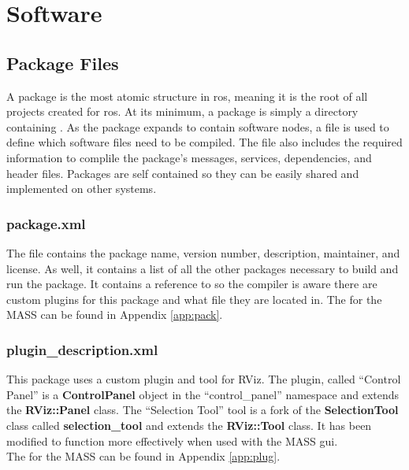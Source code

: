 \chapter{Software}
\label{chap:code}
\section{Package Files}

A package is the most atomic structure in \acrshort{ros}, meaning it is the root of all projects created for \acrshort{ros}. At its minimum, a package is simply a directory containing . As the package expands to contain software nodes, a  file is used to define which software files need to be compiled. The  file also includes the required information to complile the package's messages, services, dependencies, and header files. Packages are self contained so they can be easily shared and implemented on other systems.\\

\subsection{package.xml}
The file  contains the package name, version number, description, maintainer, and license. As well, it contains a list of all the other packages necessary to build and run the package. It contains a reference to  so the compiler is aware there are custom plugins for this package and what file they are located in.
The  for the MASS can be found in Appendix \ref{app:pack}.
\subsection{plugin\_description.xml}
This package uses a custom plugin and tool for RViz. The plugin, called ``Control Panel'' is a \textbf{ControlPanel} object in the ``control\_panel'' namespace and extends the \textbf{RViz::Panel} class. The ``Selection Tool'' tool is a fork of the \textbf{SelectionTool} class called \textbf{selection\_tool} and extends the \textbf{RViz::Tool} class. It has been modified to function more effectively when used with the MASS \acrshort{gui}.\\

The  for the MASS can be found in Appendix \ref{app:plug}.
